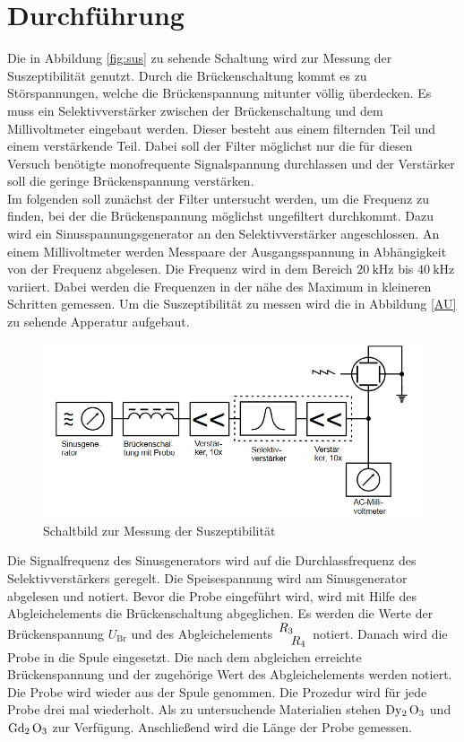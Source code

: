 \section{Durchführung}
\label{sec:Durchführung}
Die in Abbildung \ref{fig:sus} zu sehende Schaltung wird zur Messung der Suszeptibilität genutzt.
Durch die Brückenschaltung kommt es zu Störspannungen, welche die Brückenspannung mitunter völlig überdecken. Es muss ein Selektivverstärker zwischen der Brückenschaltung und dem Millivoltmeter eingebaut werden.
Dieser besteht aus einem filternden Teil und einem verstärkende Teil. Dabei soll der Filter möglichst nur die für diesen Versuch benötigte monofrequente Signalspannung durchlassen und der Verstärker 
soll die geringe Brückenspannung verstärken.
\\
Im folgenden soll zunächst der Filter untersucht werden, um die Frequenz zu finden, bei der die Brückenspannung möglichst ungefiltert durchkommt.
Dazu wird ein Sinusspannungsgenerator an den Selektivverstärker angeschlossen. An einem Millivoltmeter werden Messpaare der Ausgangsspannung in Abhängigkeit von der
Frequenz abgelesen. Die Frequenz wird in dem Bereich $\SI{20}{\kilo \hertz}$ bis $\SI{40}{\kilo \hertz}$ variiert. Dabei werden die Frequenzen in der nähe des Maximum in kleineren Schritten gemessen.
Um die Suszeptibilität zu messen wird die in Abbildung \ref{AU} zu sehende Apperatur aufgebaut.
\begin{figure}
    \centering
    \includegraphics[scale=0.4]{pics/AU.png}
    \caption{Schaltbild zur Messung der Suszeptibilität \cite{v606}}
    \label{fig:AU}
  \end{figure}
  Die Signalfrequenz des Sinusgenerators wird auf die Durchlassfrequenz des Selektivverstärkers geregelt. Die Speisespannung wird am Sinusgenerator abgelesen und notiert.
  Bevor die Probe eingeführt wird, wird mit Hilfe des Abgleichelements die Brückenschaltung abgeglichen. Es werden die Werte der Brückenspannung $U_\text{Br}$ und des Abgleichelements $\splitfrac{R_3}{R_4}$ notiert.
  Danach wird die Probe in die Spule eingesetzt. Die nach dem abgleichen erreichte Brückenspannung und der zugehörige Wert des Abgleichelements werden notiert.
  Die Probe wird wieder aus der Spule genommen. Die Prozedur wird für jede Probe drei mal wiederholt. Als zu untersuchende Materialien stehen $\ce{Dy2 O3}$ und $\ce{Gd2 O3}$ zur Verfügung.
  Anschließend wird die Länge der Probe gemessen.
